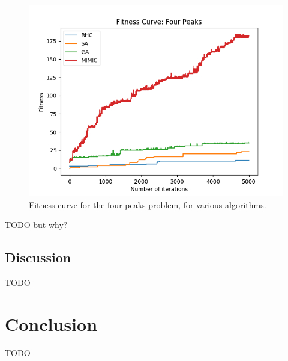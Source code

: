\documentclass{article}
\begin{document}

      \begin{figure}[htb]
      \centering
      \includegraphics[width=.5\linewidth]{out/op/fourpeaks/fitness.png}
      \caption{Fitness curve for the four peaks problem, for various algorithms.}
      \label{fig:fitness-fp}
      \end{figure}

      TODO but why?

    \subsection{Discussion}
      TODO

  \section{Conclusion}
    TODO
\end{document}
